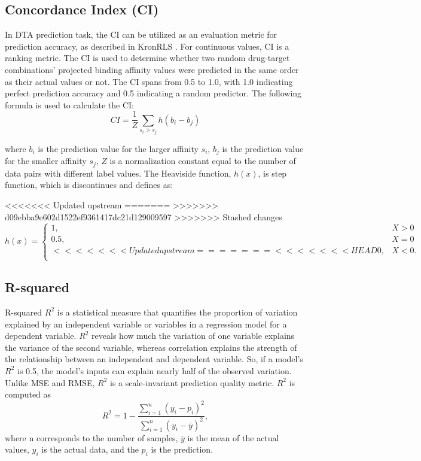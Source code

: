 \subsection{Concordance Index (CI)}
In DTA prediction task, the CI can be utilized as an evaluation metric for prediction accuracy, as described in KronRLS \cite{pahikkala2015toward}. For continuous values, CI is a ranking metric. The CI is used to determine whether two random drug-target combinations' projected binding affinity values were predicted in the same order as their actual values or not. The CI spans from 0.5 to 1.0, with 1.0 indicating perfect prediction accuracy and 0.5 indicating a random predictor. The following formula is used to calculate the CI:
\begin{equation}
    CI =  \frac{1}{Z}\sum_{s_{i} > s_{j}}^{}h(b_{i}-b_{j})
\end{equation}

where $b_i$ is the prediction value for the larger affinity $s_i$, $b_j$ is the prediction value for the smaller affinity $s_j$, $Z$ is a normalization constant equal to the number of data pairs with different label values. The Heaviside function, $h(x)$, is \cite{gonen2005concordance} step function, which is discontinues and defines as:

<<<<<<< Updated upstream
=======
>>>>>>> d09ebba9e602d1522ef9361417dc21d129009597
>>>>>>> Stashed changes
\begin{equation}
    h(x) = 
    \begin{cases}
        1, & \text{$X>0$}\\
        0.5, & \text{$X=0$}\\
<<<<<<< Updated upstream
=======
<<<<<<< HEAD
        0, & \text{$X<0$.}\\
    \end{cases}
\end{equation}
\subsection{R-squared}
R-squared $R^2$ is a statistical measure that quantifies the proportion of variation explained by an independent variable or variables in a regression model for a dependent variable. $R^2$ reveals how much the variation of one variable explains the variance of the second variable, whereas correlation explains the strength of the relationship between an independent and dependent variable. So, if a model's $R^2$ is 0.5, the model's inputs can explain nearly half of the observed variation. Unlike MSE and RMSE, $R^2$ is a scale-invariant prediction quality metric. $R^2$ is computed as
\begin{equation}
    R^2 = 1 - \frac{\sum_{i=1}^{n} (y_i - p_i)^{2}}{\sum_{i=1}^{n} (y_i - \bar{y})^{2}},
\end{equation}
\noindent where n corresponds to the number of samples, $\bar{y}$ is the mean of the actual values, $y_i$ is the actual data, and the $p_i$ is the prediction.

